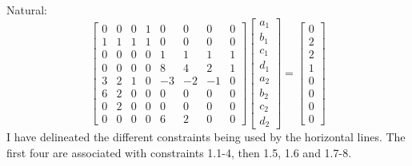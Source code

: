 \documentclass[11pt]{article}
\begin{document}
\begin{enumerate}
            Natural:
            \[
                \left[
                \begin{array}{cccccccc}
                    0 & 0 & 0 & 1 & 0 & 0 & 0 & 0   \\
                    1 & 1 & 1 & 1 & 0 & 0 & 0 & 0   \\
                    0 & 0 & 0 & 0 & 1 & 1 & 1 & 1   \\
                    0 & 0 & 0 & 0 & 8 & 4 & 2 & 1   \\
                    \hline  
                    3 & 2 & 1 & 0 &-3 &-2 &-1 & 0   \\
                    \hline
                    6 & 2 & 0 & 0 & 0 & 0 & 0 & 0   \\
                    \hline
                    0 & 2 & 0 & 0 & 0 & 0 & 0 & 0   \\
                    0 & 0 & 0 & 0 & 6 & 2 & 0 & 0   
                \end{array}
                \right]
                \begin{bmatrix}
                    a_1 \\ b_1 \\ c_1 \\ d_1 \\ a_2 \\ b_2 \\ c_2 \\ d_2
                \end{bmatrix}
                =
                \begin{bmatrix}
                    0 \\ 2 \\ 2 \\ 1 \\ 0 \\ 0 \\ 0 \\ 0 
                \end{bmatrix}
            \]
            I have delineated the different constraints being used by the
            horizontal lines. The first four are associated with constraints
            1.1-4, then 1.5, 1.6 and 1.7-8.


\end{enumerate}
\end{document}
